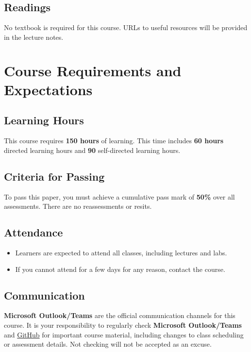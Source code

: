 \documentclass{article}
\begin{document}
\subsection*{Readings}
No textbook is required for this course. URLs to useful resources will be provided in the lecture notes.

\section*{Course Requirements and Expectations}

\subsection*{Learning Hours}
This course requires \textbf{150 hours} of learning. This time includes \textbf{60 hours} directed learning hours and \textbf{90} self-directed learning hours.

\subsection*{Criteria for Passing}
To pass this paper, you must achieve a cumulative pass mark of \textbf{50\%} over all assessments. There are no reassessments or resits.

\subsection*{Attendance}
\begin{itemize}
	\item Learners are expected to attend all classes, including lectures and labs.
	\item If you cannot attend for a few days for any reason, contact the course.
\end{itemize}

\subsection*{Communication}
\textbf{Microsoft Outlook/Teams} are the official communication channels for this course. It is your responsibility to regularly check \textbf{Microsoft Outlook/Teams} and \href{https://github.com/otago-polytechnic-bit-courses/ID737001-game-development}{GitHub} for important course material, including changes to class scheduling or assessment details. Not checking will not be accepted as an excuse.
\end{document}
